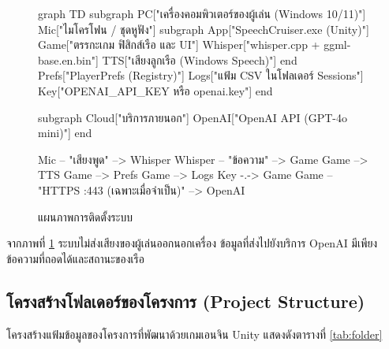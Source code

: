 \begin{figure}[!htbp]
\centering
\begin{mermaid}
graph TD
    subgraph PC["เครื่องคอมพิวเตอร์ของผู้เล่น (Windows 10/11)"]
        Mic["ไมโครโฟน / ชุดหูฟัง"]
        subgraph App["SpeechCruiser.exe (Unity)"]
            Game["ตรรกะเกม ฟิสิกส์เรือ และ UI"]
            Whisper["whisper.cpp + ggml-base.en.bin"]
            TTS["เสียงลูกเรือ (Windows Speech)"]
        end
        Prefs["PlayerPrefs (Registry)"]
        Logs["แฟ้ม CSV ในโฟลเดอร์ Sessions"]
        Key["OPENAI_API_KEY หรือ openai.key"]
    end

    subgraph Cloud["บริการภายนอก"]
        OpenAI["OpenAI API (GPT-4o mini)"]
    end

    Mic -- "เสียงพูด" --> Whisper
    Whisper -- "ข้อความ" --> Game
    Game --> TTS
    Game --> Prefs
    Game --> Logs
    Key -.-> Game
    Game -- "HTTPS :443 (เฉพาะเมื่อจำเป็น)" --> OpenAI
\end{mermaid}
\caption{แผนภาพการติดตั้งระบบ}
\label{fig:deployment}
\end{figure}

จากภาพที่ \ref{fig:deployment} ระบบไม่ส่งเสียงของผู้เล่นออกนอกเครื่อง ข้อมูลที่ส่งไปยังบริการ OpenAI มีเพียงข้อความที่ถอดได้และสถานะของเรือ

\subsection{โครงสร้างโฟลเดอร์ของโครงการ (Project Structure)}

โครงสร้างแฟ้มข้อมูลของโครงการที่พัฒนาด้วยเกมเอนจิน Unity แสดงดังตารางที่ \ref{tab:folder}

